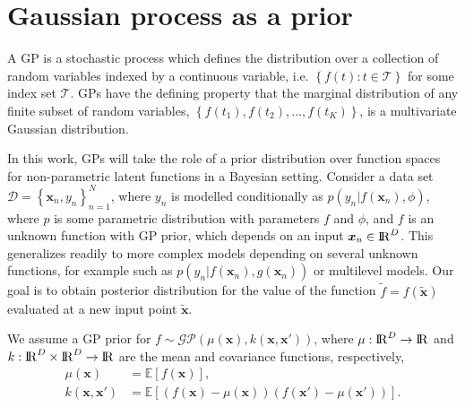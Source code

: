 \documentclass[onecolumn,a4paper,11pt]{article}
\begin{document}
\section{Gaussian process as a prior}\label{ch4_gp}

A GP is a stochastic process which defines the distribution over a collection of random variables indexed by a continuous variable, i.e. $\left\lbrace f(t): t \in \mathcal{T}\right\rbrace$ for some index set $\mathcal{T}$. GPs have the defining property that the marginal distribution of any finite subset of random variables, $\left\lbrace f(t_1), f(t_2), \hdots, f(t_K) \right\rbrace$, is a multivariate Gaussian distribution.

In this work, GPs will take the role of a prior distribution over function spaces for non-parametric latent functions in a Bayesian setting. 
Consider a data set $\mathcal{D} = \left\lbrace \bm{x}_n, y_n \right\rbrace_{n=1}^N$, where $y_n$ is modelled conditionally as $p(y_n|f(\bm{x}_n),\phi)$, where $p$ is some parametric distribution with parameters $f$ and $\phi$, and $f$ is an unknown function with GP prior, which depends on an input $\bm{x}_n\in {\rm I\!R}^D$. This generalizes readily to more complex models depending on several unknown functions, for example such as $p(y_n|f(\bm{x}_n),g(\bm{x}_n))$ or multilevel models. Our goal is to obtain posterior distribution for the value of the function $\tilde{f}=f(\tilde{\bm{x}})$  evaluated at a new input point $\tilde{\bm{x}}$.

We assume a GP prior for $f \sim \mathcal{GP}(\mu(\bm{x}), k(\bm{x}, \bm{x}'))$, where $\mu: {\rm I\!R}^D \rightarrow {\rm I\!R}$ and $k: {\rm I\!R}^D \times {\rm I\!R}^D \rightarrow {\rm I\!R}$ are the mean and covariance functions, respectively,
%
\begin{align*}
 	\mu(\bm{x}) &= \mathbb{E}\!\left[f(\bm{x})\right],\\ 
 	k(\bm{x}, \bm{x}') &= \mathbb{E}\!\left[\left( f(\bm{x}) - \mu(\bm{x}) \right)\left( f(\bm{x}') - \mu(\bm{x}') \right)\right].
\end{align*} 
\end{document}
